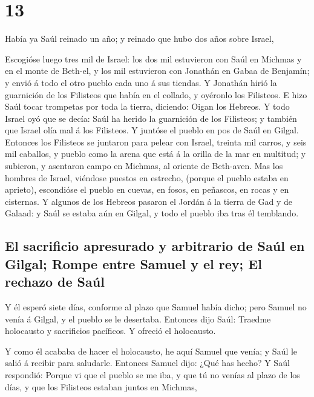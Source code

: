 \hypertarget{section-12}{%
\section{13}\label{section-12}}

 Había ya Saúl reinado un año; y reinado que hubo dos años
sobre Israel,

 Escogióse luego tres mil de Israel: los dos mil estuvieron
con Saúl en Michmas y en el monte de Beth-el, y los mil estuvieron con
Jonathán en Gabaa de Benjamín; y envió á todo el otro pueblo cada uno á
sus tiendas.  Y Jonathán hirió la guarnición de los
Filisteos que había en el collado, y oyéronlo los Filisteos. E hizo Saúl
tocar trompetas por toda la tierra, diciendo: Oigan los Hebreos.
 Y todo Israel oyó que se decía: Saúl ha herido la
guarnición de los Filisteos; y también que Israel olía mal á los
Filisteos. Y juntóse el pueblo en pos de Saúl en Gilgal. 
Entonces los Filisteos se juntaron para pelear con Israel, treinta mil
carros, y seis mil caballos, y pueblo como la arena que está á la orilla
de la mar en multitud; y subieron, y asentaron campo en Michmas, al
oriente de Beth-aven.  Mas los hombres de Israel, viéndose
puestos en estrecho, (porque el pueblo estaba en aprieto), escondióse el
pueblo en cuevas, en fosos, en peñascos, en rocas y en cisternas.
 Y algunos de los Hebreos pasaron el Jordán á la tierra de
Gad y de Galaad: y Saúl se estaba aún en Gilgal, y todo el pueblo iba
tras él temblando.

\hypertarget{el-sacrificio-apresurado-y-arbitrario-de-sauxfal-en-gilgal-rompe-entre-samuel-y-el-rey-el-rechazo-de-sauxfal}{%
\subsection{El sacrificio apresurado y arbitrario de Saúl en Gilgal;
Rompe entre Samuel y el rey; El rechazo de
Saúl}\label{el-sacrificio-apresurado-y-arbitrario-de-sauxfal-en-gilgal-rompe-entre-samuel-y-el-rey-el-rechazo-de-sauxfal}}

 Y él esperó siete días, conforme al plazo que Samuel había
dicho; pero Samuel no venía á Gilgal, y el pueblo se le desertaba.
 Entonces dijo Saúl: Traedme holocausto y sacrificios
pacíficos. Y ofreció el holocausto.

 Y como él acababa de hacer el holocausto, he aquí Samuel
que venía; y Saúl le salió á recibir para saludarle. 
Entonces Samuel dijo: ¿Qué has hecho? Y Saúl respondió: Porque vi que el
pueblo se me iba, y que tú no venías al plazo de los días, y que los
Filisteos estaban juntos en Michmas,

